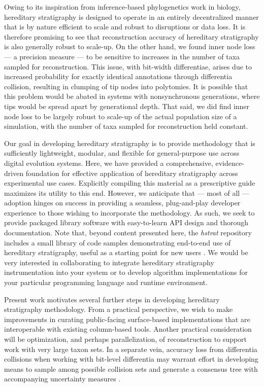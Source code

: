 Owing to its inspiration from inference-based phylogenetics work in biology, hereditary stratigraphy is designed to operate in an entirely decentralized manner that is by nature efficient to scale and robust to disruptions or data loss.
It is therefore promising to see that reconstruction accuracy of hereditary stratigraphy is also generally robust to scale-up.
On the other hand, we found inner node loss --- a precision measure --- to be sensitive to increases in the number of taxa sampled for reconstruction.
This issue, with bit-width differentiae, arises due to increased probability for exactly identical annotations through differentia collision, resulting in clumping of tip nodes into polytomies.
It is possible that this problem would be abated in systems with nonsynchronous generations, where tips would be spread apart by generational depth.
That said, we did find inner node loss to be largely robust to scale-up of the actual population size of a simulation, with the number of taxa sampled for reconstruction held constant.

Our goal in developing hereditary stratigraphy is to provide methodology that is sufficiently lightweight, modular, and flexible for general-purpose use across digital evolution systems.
Here, we have provided a comprehensive, evidence-driven foundation for effective application of hereditary stratigraphy across experimental use cases.
Explicitly compiling this material as a prescriptive guide maximizes its utility to this end.
However, we anticipate that --- most of all --- adoption hinges on success in providing a seamless, plug-and-play developer experience to those wishing to incorporate the methodology.
As such, we seek to provide packaged library software with easy-to-learn API design and thorough documentation.
Note that, beyond content presented here, the \textit{hstrat} repository includes a small library of code samples demonstrating end-to-end use of hereditary stratigraphy, useful as a starting point for new users \citep{moreno2022hstrat}.
We would be very interested in collaborating to integrate hereditary stratigraphy instrumentation into your system or to develop algorithm implementations for your particular programming language and runtime environment.

Present work motivates several further steps in developing hereditary stratigraphy methodology.
From a practical perspective, we wish to make improvements in curating public-facing surface-based implementations that are interoperable with existing column-based tools.
Another practical consideration will be optimization, and perhaps parallelization, of reconstruction to support work with very large taxon sets.
In a separate vein, accuracy loss from differentia collisions when working with bit-level differentia may warrant effort in developing means to sample among possible collision sets and generate a consensus tree with accompanying uncertainty measures \citep{bryant2003classification}.

